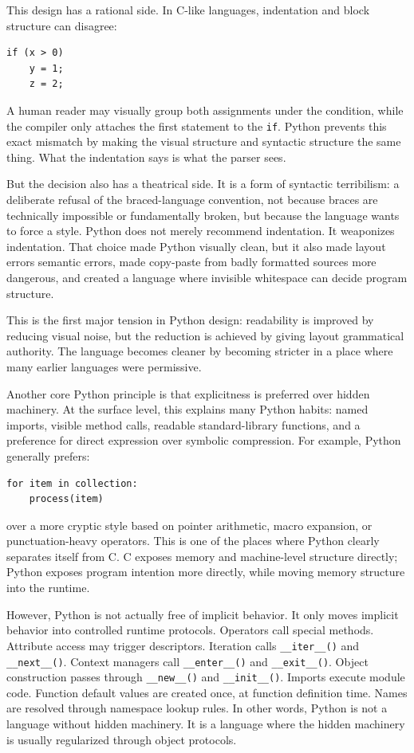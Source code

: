 This design has a rational side. In C-like languages, indentation and block structure can disagree:

\begin{verbatim}
if (x > 0)
    y = 1;
    z = 2;
\end{verbatim}

A human reader may visually group both assignments under the condition, while the compiler only attaches the first statement to the \texttt{if}. Python prevents this exact mismatch by making the visual structure and syntactic structure the same thing. What the indentation says is what the parser sees.

But the decision also has a theatrical side. It is a form of syntactic terribilism: a deliberate refusal of the braced-language convention, not because braces are technically impossible or fundamentally broken, but because the language wants to force a style. Python does not merely recommend indentation. It weaponizes indentation. That choice made Python visually clean, but it also made layout errors semantic errors, made copy-paste from badly formatted sources more dangerous, and created a language where invisible whitespace can decide program structure.

This is the first major tension in Python design: readability is improved by reducing visual noise, but the reduction is achieved by giving layout grammatical authority. The language becomes cleaner by becoming stricter in a place where many earlier languages were permissive.

Another core Python principle is that explicitness is preferred over hidden machinery. At the surface level, this explains many Python habits: named imports, visible method calls, readable standard-library functions, and a preference for direct expression over symbolic compression. For example, Python generally prefers:

\begin{verbatim}
for item in collection:
    process(item)
\end{verbatim}

over a more cryptic style based on pointer arithmetic, macro expansion, or punctuation-heavy operators. This is one of the places where Python clearly separates itself from C. C exposes memory and machine-level structure directly; Python exposes program intention more directly, while moving memory structure into the runtime.

However, Python is not actually free of implicit behavior. It only moves implicit behavior into controlled runtime protocols. Operators call special methods. Attribute access may trigger descriptors. Iteration calls \texttt{\_\_iter\_\_()} and \texttt{\_\_next\_\_()}. Context managers call \texttt{\_\_enter\_\_()} and \texttt{\_\_exit\_\_()}. Object construction passes through \texttt{\_\_new\_\_()} and \texttt{\_\_init\_\_()}. Imports execute module code. Function default values are created once, at function definition time. Names are resolved through namespace lookup rules. In other words, Python is not a language without hidden machinery. It is a language where the hidden machinery is usually regularized through object protocols.

